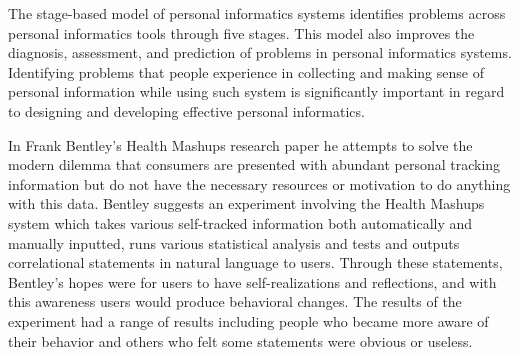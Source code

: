 The stage-based model of personal informatics systems identifies problems across personal informatics tools through five stages. This model also improves the diagnosis, assessment, and prediction of problems in personal informatics systems. Identifying problems that people experience in collecting and making sense of personal information while using such system is significantly important in regard to designing and developing effective personal informatics.

In Frank Bentley’s Health Mashups \cite{bentley2013health} research paper he attempts to solve the modern dilemma that consumers are presented with abundant personal tracking information but do not have the necessary resources or motivation to do anything with this data. Bentley suggests an experiment involving the Health Mashups system which takes various self-tracked information both automatically and manually inputted, runs various statistical analysis and tests and outputs correlational statements in natural language to users. Through these statements, Bentley’s hopes were for users to have self-realizations and reflections, and with this awareness users would produce behavioral changes. The results of the experiment had a range of results including people who became more aware of their behavior and others who felt some statements were obvious or useless.